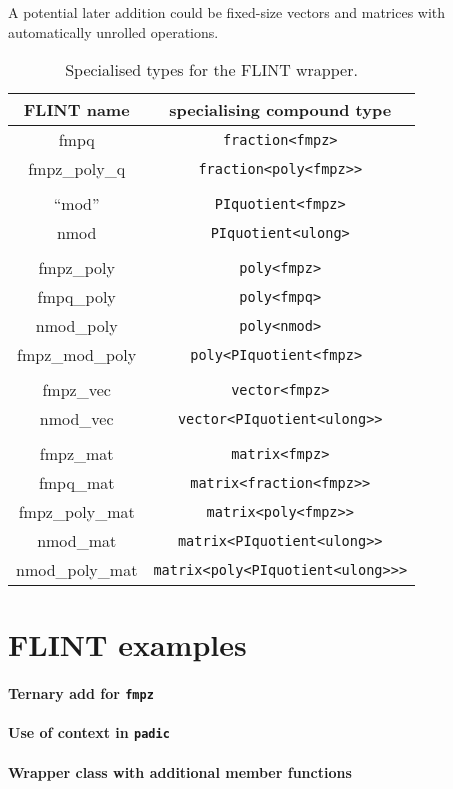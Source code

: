 \documentclass{scrartcl}
\begin{document}
A potential later addition could be fixed-size vectors and matrices with
automatically unrolled operations.

\begin{table}[h]
\begin{center}
\begin{tabular}{cc}
FLINT name & specialising compound type \\
\hline
fmpq & \texttt{fraction<fmpz>} \\
fmpz\_poly\_q & \texttt{fraction<poly<fmpz>>} \\
\\
``mod'' & \texttt{PIquotient<fmpz>} \\
nmod & \texttt{PIquotient<ulong>} \\
\\
fmpz\_poly & \texttt{poly<fmpz>} \\
fmpq\_poly & \texttt{poly<fmpq>} \\
nmod\_poly & \texttt{poly<nmod>} \\
fmpz\_mod\_poly & \texttt{poly<PIquotient<fmpz> } \\
\\
fmpz\_vec & \texttt{vector<fmpz>} \\
nmod\_vec & \texttt{vector<PIquotient<ulong>>} \\
\\
fmpz\_mat & \texttt{matrix<fmpz>} \\
fmpq\_mat & \texttt{matrix<fraction<fmpz>>} \\
fmpz\_poly\_mat & \texttt{matrix<poly<fmpz>>} \\
nmod\_mat & \texttt{matrix<PIquotient<ulong>>} \\
nmod\_poly\_mat & \texttt{matrix<poly<PIquotient<ulong>>>}
\end{tabular}
\end{center}
\caption{Specialised types for the FLINT wrapper.}
\label{tab:specialised-types}
\end{table}

\section*{FLINT examples}

\paragraph{Ternary add for \texttt{fmpz}}

\paragraph{Use of context in \texttt{padic}}

\paragraph{Wrapper class with additional member functions}
\end{document}
